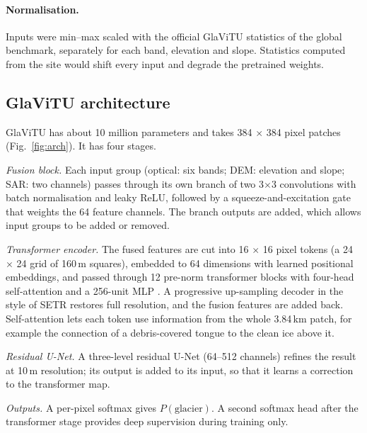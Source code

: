 \documentclass[pdflatex,sn-mathphys-num]{sn-jnl}%
\theoremstyle{thmstyleone}%
\theoremstyle{thmstyletwo}%
\theoremstyle{thmstylethree}%
\begin{document}
\paragraph{Normalisation.} Inputs were min--max scaled with the official GlaViTU statistics of the global benchmark, separately for each band, elevation and slope. Statistics computed from the site would shift every input and degrade the pretrained weights.

\subsection{GlaViTU architecture}\label{subsec3.3}

GlaViTU \cite{maslov2025} has about 10 million parameters and takes 384 $\times$ 384 pixel patches (Fig.~\ref{fig:arch}). It has four stages.

\emph{Fusion block.} Each input group (optical: six bands; DEM: elevation and slope; SAR: two channels) passes through its own branch of two 3$\times$3 convolutions with batch normalisation and leaky ReLU, followed by a squeeze-and-excitation gate \cite{hu2018} that weights the 64 feature channels. The branch outputs are added, which allows input groups to be added or removed.

\emph{Transformer encoder.} The fused features are cut into 16 $\times$ 16 pixel tokens (a 24 $\times$ 24 grid of 160\,m squares), embedded to 64 dimensions with learned positional embeddings, and passed through 12 pre-norm transformer blocks with four-head self-attention and a 256-unit MLP \cite{dosovitskiy2021}. A progressive up-sampling decoder in the style of SETR \cite{zheng2021} restores full resolution, and the fusion features are added back. Self-attention lets each token use information from the whole 3.84\,km patch, for example the connection of a debris-covered tongue to the clean ice above it.

\emph{Residual U-Net.} A three-level residual U-Net \cite{ronneberger2015,he2016} (64--512 channels) refines the result at 10\,m resolution; its output is added to its input, so that it learns a correction to the transformer map.

\emph{Outputs.} A per-pixel softmax gives $P(\mathrm{glacier})$. A second softmax head after the transformer stage provides deep supervision during training only.
\end{document}
